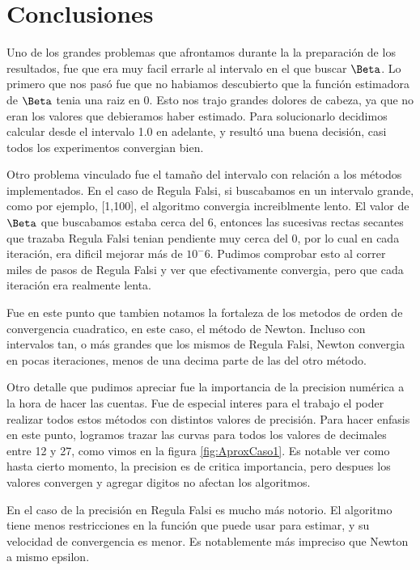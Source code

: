 \section{Conclusiones}

Uno de los grandes problemas que afrontamos durante la la preparaci\'on de los resultados,
fue que era muy facil errarle al intervalo en el que buscar $\Beta$. Lo primero que nos pas\'o fue
que no habiamos descubierto que la funci\'on estimadora de $\Beta$ tenia una raiz en 0. Esto nos trajo grandes
dolores de cabeza, ya que no eran los valores que debieramos haber estimado. Para solucionarlo decidimos calcular
desde el intervalo 1.0 en adelante, y result\'o una buena decisi\'on, casi todos los experimentos convergian bien.

Otro problema vinculado fue el tama\~no del intervalo con relaci\'on a los m\'etodos implementados. 
En el caso de Regula Falsi, si buscabamos en un intervalo grande, como por ejemplo, [1,100], el algoritmo 
convergia increiblmente lento. El valor de $\Beta$ que buscabamos estaba cerca del 6, entonces las 
sucesivas rectas secantes que trazaba Regula Falsi tenian pendiente muy cerca del 0, por lo cual en cada 
iteraci\'on, era dificil mejorar m\'as de $10^-6$. Pudimos comprobar esto al correr miles de pasos de Regula Falsi y ver que efectivamente convergia, pero
que cada iteraci\'on era realmente lenta.

Fue en este punto que tambien notamos la fortaleza de los metodos de orden de convergencia cuadratico,
en este caso, el m\'etodo de Newton. Incluso con intervalos tan, o m\'as grandes que los mismos de Regula Falsi, 
Newton convergia en pocas iteraciones, menos de una decima parte de las del otro m\'etodo.



Otro detalle que pudimos apreciar fue la importancia de la precision num\'erica a la hora de hacer las cuentas. 
Fue de especial interes para el trabajo el poder realizar todos estos m\'etodos con distintos valores 
de precisi\'on. Para hacer enfasis en este punto, logramos trazar las curvas para todos los valores de decimales 
entre 12 y 27, como vimos en la figura \ref{fig:AproxCaso1}.
Es notable ver como hasta cierto momento, la precision es de critica importancia, pero despues los valores convergen y 
agregar digitos no afectan los algoritmos.

En el caso de la precisi\'on en Regula Falsi es mucho m\'as notorio. El algoritmo tiene menos restricciones en 
la funci\'on que puede usar para estimar, y su velocidad de convergencia es menor. Es notablemente m\'as impreciso
que Newton a mismo epsilon.
